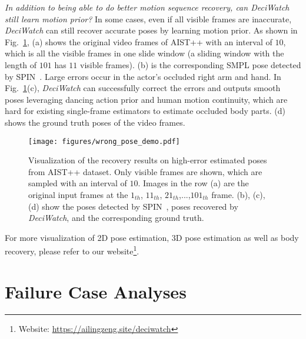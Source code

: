 \documentclass[runningheads]{llncs}
\newcommand{\name}{\emph{DeciWatch}\xspace}
\begin{document}
\emph{In addition to being able to do better motion sequence recovery, can \name still learn motion prior?}
In some cases, even if all visible frames are inaccurate, \name can still recover accurate poses by learning motion prior. As shown in Fig.~\ref{fig:all_wrong_visible}, (a) shows the original video frames of AIST++ with an interval of $10$, which is all the visible frames in one slide window (a sliding window with the length of $101$ has $11$ visible frames). (b) is the corresponding SMPL pose detected by SPIN~\cite{kolotouros2019spin}. Large errors occur in the actor's occluded right arm and hand. In Fig.~\ref{fig:all_wrong_visible}(c), \name can successfully correct the errors and outputs smooth poses leveraging dancing action prior and human motion continuity, which are hard for existing single-frame estimators to estimate occluded body parts. (d) shows the ground truth poses of the video frames.


\begin{figure}[h]	
\centering
 	
 		\begin{minipage}[t]{0.98\linewidth}
 			\centering         
 			\texttt{[image: figures/wrong\_pose\_demo.pdf]}   
 		\end{minipage}
    	
\caption{Visualization of the recovery results on high-error estimated poses from AIST++ dataset. Only visible frames are shown, which are sampled with an interval of $10$. Images in the row (a) are the original input frames at the $1_{th}$, $11_{th}$, $21_{th}$,...,$101_{th}$ frame. (b), (c), (d) show the poses detected by SPIN~\cite{kolotouros2019spin}, poses recovered by \name, and the corresponding ground truth. }
\label{fig:all_wrong_visible} 
\end{figure} 

For more visualization of 2D pose estimation, 3D pose estimation as well as body recovery, please refer to our website\footnote{Website: \url{https://ailingzeng.site/deciwatch}}.



\section{Failure Case Analyses}
\label{sec:supp_fail}
\end{document}

